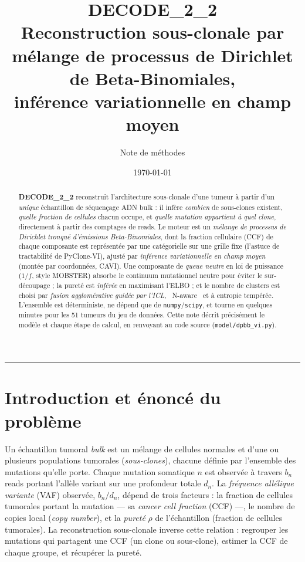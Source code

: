 \documentclass[11pt,a4paper]{article}
\title{\textbf{DECODE\_2\_2}\\[2pt]
\large Reconstruction sous-clonale par mélange de processus de Dirichlet
de Beta-Binomiales,\\ inférence variationnelle en champ moyen}
\author{Note de méthodes}
\date{\today}
\providecommand{\og}{\guillemotleft~}
\providecommand{\fg}{~\guillemotright}
\newcommand{\code}[1]{\texttt{#1}}
\theoremstyle{remark}
\begin{document}
\maketitle

\begin{abstract}
\noindent
\textbf{DECODE\_2\_2} reconstruit l'architecture sous-clonale d'une tumeur à partir
d'un \emph{unique} échantillon de séquençage ADN bulk : il infère \emph{combien} de
sous-clones existent, \emph{quelle fraction de cellules} chacun occupe, et \emph{quelle
mutation appartient à quel clone}, directement à partir des comptages de reads. Le moteur
est un \emph{mélange de processus de Dirichlet tronqué d'émissions Beta-Binomiales}, dont
la fraction cellulaire (CCF) de chaque composante est représentée par une catégorielle sur
une grille fixe (l'astuce de tractabilité de PyClone-VI), ajusté par \emph{inférence
variationnelle en champ moyen} (montée par coordonnées, CAVI). Une composante de
\emph{queue neutre} en loi de puissance ($1/f$, style MOBSTER) absorbe le continuum
mutationnel neutre pour éviter le sur-découpage ; la pureté est \emph{inférée} en
maximisant l'ELBO ; et le nombre de clusters est choisi par \emph{fusion agglomérative
guidée par l'ICL}, \og{}N-aware\fg{} et à entropie tempérée. L'ensemble est déterministe,
ne dépend que de \code{numpy}/\code{scipy}, et tourne en quelques minutes pour les 51
tumeurs du jeu de données. Cette note décrit précisément le modèle et chaque étape de
calcul, en renvoyant au code source (\code{model/dpbb\_vi.py}).
\end{abstract}

\tableofcontents
\medskip
\hrule

\section{Introduction et énoncé du problème}

Un échantillon tumoral \emph{bulk} est un mélange de cellules normales et d'une ou
plusieurs populations tumorales (\emph{sous-clones}), chacune définie par l'ensemble des
mutations qu'elle porte. Chaque mutation somatique $n$ est observée à travers $b_n$ reads
portant l'allèle variant sur une profondeur totale $d_n$. La \emph{fréquence allélique
variante} (VAF) observée, $b_n/d_n$, dépend de trois facteurs : la fraction de cellules
tumorales portant la mutation --- sa \emph{cancer cell fraction} (CCF) ---, le nombre de
copies local (\emph{copy number}), et la \emph{pureté} $\rho$ de l'échantillon (fraction de
cellules tumorales). La reconstruction sous-clonale inverse cette relation : regrouper les
mutations qui partagent une CCF (un clone ou sous-clone), estimer la CCF de chaque groupe,
et récupérer la pureté.
\end{document}
